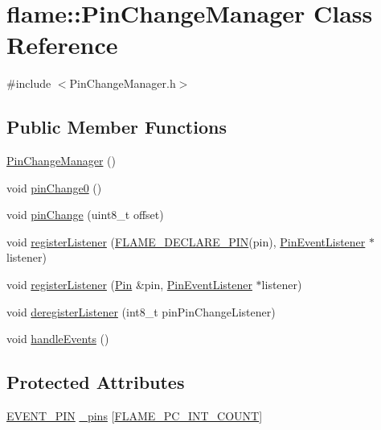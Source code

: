 \hypertarget{classflame_1_1_pin_change_manager}{\section{flame\-:\-:Pin\-Change\-Manager Class Reference}
\label{classflame_1_1_pin_change_manager}
}


{\ttfamily \#include $<$Pin\-Change\-Manager.\-h$>$}

\subsection*{Public Member Functions}
\begin{DoxyCompactItemize}
\item 
\hyperlink{classflame_1_1_pin_change_manager_a1b60ddb12e1bbff6e5b6b7496e77b5c7}{Pin\-Change\-Manager} ()
\item 
void \hyperlink{classflame_1_1_pin_change_manager_a113e55dec9a2581dfc1b888399e95cd7}{pin\-Change0} ()
\item 
void \hyperlink{classflame_1_1_pin_change_manager_a4e718462803b9eb630a4522106029b1f}{pin\-Change} (uint8\-\_\-t offset)
\item 
void \hyperlink{classflame_1_1_pin_change_manager_a5577f9500502aaaedc0f9e964bfedd8f}{register\-Listener} (\hyperlink{io_8h_ab54f3ca5cc36256b922289e8e92316a3}{F\-L\-A\-M\-E\-\_\-\-D\-E\-C\-L\-A\-R\-E\-\_\-\-P\-I\-N}(pin), \hyperlink{classflame_1_1_pin_event_listener}{Pin\-Event\-Listener} $\ast$listener)
\item 
void \hyperlink{classflame_1_1_pin_change_manager_a9705cc613533d22a35476adc444080a1}{register\-Listener} (\hyperlink{classflame_1_1_pin}{Pin} \&pin, \hyperlink{classflame_1_1_pin_event_listener}{Pin\-Event\-Listener} $\ast$listener)
\item 
void \hyperlink{classflame_1_1_pin_change_manager_a5e643ae7693542e0d796b02d992171b3}{deregister\-Listener} (int8\-\_\-t pin\-Pin\-Change\-Listener)
\item 
void \hyperlink{classflame_1_1_pin_change_manager_ab24024100cf08ec1691f689c2c1dbb37}{handle\-Events} ()
\end{DoxyCompactItemize}
\subsection*{Protected Attributes}
\begin{DoxyCompactItemize}
\item 
\hyperlink{namespaceflame_a2f4f205987821e931681b9ed5ca0eaf2}{E\-V\-E\-N\-T\-\_\-\-P\-I\-N} \hyperlink{classflame_1_1_pin_change_manager_afaa54897b9dbbfe52593512b9fe19cb2}{\-\_\-pins} \mbox{[}\hyperlink{attiny85_8h_ab39f7ddad6e692db1c00115db776636f}{F\-L\-A\-M\-E\-\_\-\-P\-C\-\_\-\-I\-N\-T\-\_\-\-C\-O\-U\-N\-T}\mbox{]}
\end{DoxyCompactItemize}



